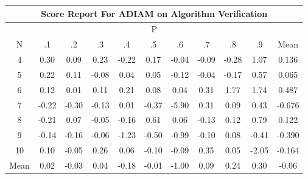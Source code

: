 \documentclass[11pt,a4paper]{report}
\begin{document}
\begin{longtable}{ | c || c | c | c | c | c | c | c | c | c || c |}
\hline
\multicolumn{11}{|c|}{ Score Report For ADIAM on Algorithm Verification} \\
\hline
\multicolumn{11}{|c|}{ P } \\
\hline
N & .1 & .2 & .3 & .4 & .5 & .6 & .7 & .8 & .9 & Mean\\
 \hline
 \hline
 \endhead
  4 &  \cellcolor[HTML]{F7F7FF} 0.30 &  \cellcolor[HTML]{FFFFFF} 0.09 &  \cellcolor[HTML]{F7F7FF} 0.23 &  \cellcolor[HTML]{FFF7F7} -0.22 &  \cellcolor[HTML]{F7F7FF} 0.17 &  \cellcolor[HTML]{FFFFFF} -0.04 &  \cellcolor[HTML]{FFFFFF} -0.09 &  \cellcolor[HTML]{FFF7F7} -0.28 &  \cellcolor[HTML]{E7E7FF} 1.07 & 0.136 \\
  5 &  \cellcolor[HTML]{F7F7FF} 0.22 &  \cellcolor[HTML]{FFFFFF} 0.11 &  \cellcolor[HTML]{FFFFFF} -0.08 &  \cellcolor[HTML]{FFFFFF} 0.04 &  \cellcolor[HTML]{FFFFFF} 0.05 &  \cellcolor[HTML]{FFFFFF} -0.12 &  \cellcolor[HTML]{FFFFFF} -0.04 &  \cellcolor[HTML]{FFF7F7} -0.17 &  \cellcolor[HTML]{EFEFFF} 0.57 & 0.065 \\
  6 &  \cellcolor[HTML]{FFFFFF} 0.12 &  \cellcolor[HTML]{FFFFFF} 0.01 &  \cellcolor[HTML]{FFFFFF} 0.11 &  \cellcolor[HTML]{F7F7FF} 0.21 &  \cellcolor[HTML]{FFFFFF} 0.08 &  \cellcolor[HTML]{FFFFFF} 0.04 &  \cellcolor[HTML]{F7F7FF} 0.31 &  \cellcolor[HTML]{CFCFFF} 1.77 &  \cellcolor[HTML]{D7D7FF} 1.74 & 0.487 \\
  7 &  \cellcolor[HTML]{FFF7F7} -0.22 &  \cellcolor[HTML]{FFF7F7} -0.30 &  \cellcolor[HTML]{FFFFFF} -0.13 &  \cellcolor[HTML]{FFFFFF} 0.01 &  \cellcolor[HTML]{FFF7F7} -0.37 &  \cellcolor[HTML]{FF6868} -5.90 &  \cellcolor[HTML]{F7F7FF} 0.31 &  \cellcolor[HTML]{FFFFFF} 0.09 &  \cellcolor[HTML]{F7F7FF} 0.43 & -0.676 \\
  8 &  \cellcolor[HTML]{FFF7F7} -0.21 &  \cellcolor[HTML]{FFFFFF} 0.07 &  \cellcolor[HTML]{FFFFFF} -0.05 &  \cellcolor[HTML]{FFF7F7} -0.16 &  \cellcolor[HTML]{EFEFFF} 0.61 &  \cellcolor[HTML]{FFFFFF} 0.06 &  \cellcolor[HTML]{FFFFFF} -0.13 &  \cellcolor[HTML]{FFFFFF} 0.12 &  \cellcolor[HTML]{EFEFFF} 0.79 & 0.122 \\
  9 &  \cellcolor[HTML]{FFFFFF} -0.14 &  \cellcolor[HTML]{FFF7F7} -0.16 &  \cellcolor[HTML]{FFFFFF} -0.06 &  \cellcolor[HTML]{FFDFDF} -1.23 &  \cellcolor[HTML]{FFEFEF} -0.50 &  \cellcolor[HTML]{FFE7E7} -0.99 &  \cellcolor[HTML]{FFFFFF} -0.10 &  \cellcolor[HTML]{FFFFFF} 0.08 &  \cellcolor[HTML]{FFF7F7} -0.41 & -0.390 \\
  10 &  \cellcolor[HTML]{FFFFFF} 0.10 &  \cellcolor[HTML]{FFFFFF} -0.05 &  \cellcolor[HTML]{F7F7FF} 0.26 &  \cellcolor[HTML]{FFFFFF} 0.06 &  \cellcolor[HTML]{FFFFFF} -0.10 &  \cellcolor[HTML]{FFFFFF} -0.09 &  \cellcolor[HTML]{F7F7FF} 0.35 &  \cellcolor[HTML]{FFFFFF} 0.05 &  \cellcolor[HTML]{FFCFCF} -2.05 & -0.164 \\
 \hline
 \hline
Mean &  \cellcolor[HTML]{FFFFFF} 0.02 &  \cellcolor[HTML]{FFFFFF} -0.03 &  \cellcolor[HTML]{FFFFFF} 0.04 &  \cellcolor[HTML]{FFF7F7} -0.18 &  \cellcolor[HTML]{FFFFFF} -0.01 &  \cellcolor[HTML]{FFE7E7} -1.00 &  \cellcolor[HTML]{FFFFFF} 0.09 &  \cellcolor[HTML]{F7F7FF} 0.24 &  \cellcolor[HTML]{F7F7FF} 0.30 &  \cellcolor[HTML]{FFFFFF} -0.06
\end{longtable}
\end{document}
